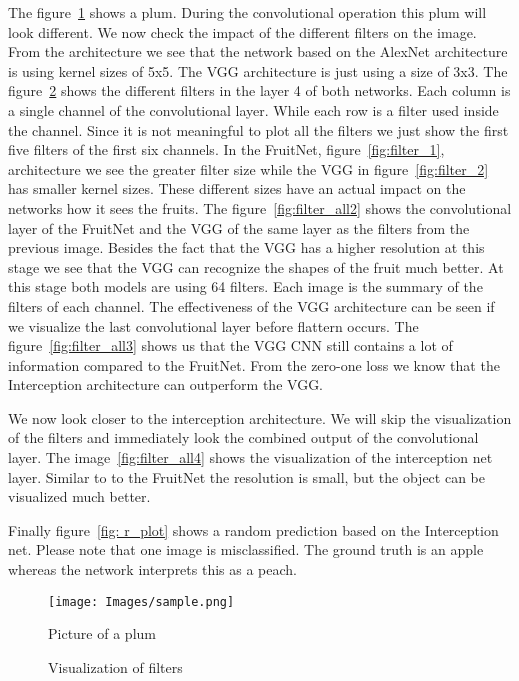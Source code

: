 \documentclass[11pt, a4paper]{article}
\begin{document}
The figure~\ref{fig: pattern} shows a plum. During the convolutional operation this plum will look different. We now check the impact of the different filters on the image. From the architecture we see that the network based on the AlexNet architecture is using kernel sizes of 5x5. The VGG architecture is just using a size of 3x3. The figure~\ref{fig:filter_all} shows the different filters in the layer 4 of both networks. Each column is a single channel of the convolutional layer. While each row is a filter used inside the channel. Since it is not meaningful to plot all the filters we just show the first five filters of the first six channels. In the FruitNet, figure~\ref{fig:filter_1}, architecture we see the greater filter size while the VGG in figure~\ref{fig:filter_2} has smaller kernel sizes. These different sizes have an actual impact on the networks how it sees the fruits. The figure~\ref{fig:filter_all2} shows the convolutional layer of the FruitNet and the VGG of the same layer as the filters from the previous image. Besides the fact that the VGG has a higher resolution at this stage we see that the VGG can recognize the shapes of the fruit much better. At this stage both models are using 64 filters. Each image is the summary of the filters of each channel. The effectiveness of the VGG architecture can be seen if we visualize the last convolutional layer before flattern occurs. The figure~\ref{fig:filter_all3} shows us that the VGG CNN still contains a lot of information compared to the FruitNet. From the zero-one loss we know that the Interception architecture can outperform the VGG. 

We now look closer to the interception architecture. We will skip the visualization of the filters and immediately look the combined output of the convolutional layer. The image~\ref{fig:filter_all4} shows the visualization of the interception net layer. Similar to to the FruitNet the resolution is small, but the object can be visualized much better.

Finally figure~\ref{fig: r_plot} shows a random prediction based on the Interception net. Please note that one image is misclassified. The ground truth is an apple whereas the network interprets this as a peach.

\begin{figure}
\centering
\texttt{[image: Images/sample.png]} 
\caption{Picture of a plum}
\label{fig: pattern}
\end{figure}

\begin{figure}
\centering
    \hfill
    \caption{Visualization of filters}
    \label{fig:filter_all}
\end{figure}
\end{document}
